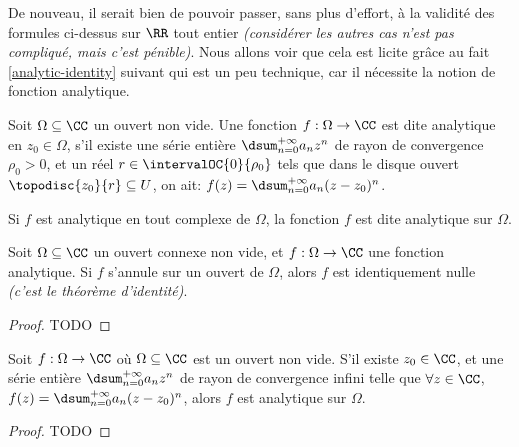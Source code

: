 De nouveau, il serait bien de pouvoir passer, sans plus d'effort, à la validité des formules ci-dessus sur $\RR$ tout entier \emph{(considérer les autres cas n'est pas compliqué, mais c'est pénible)}.
%
Nous allons voir que cela est licite grâce au fait \ref{analytic-identity} suivant qui est un peu technique, car il nécessite la notion de fonction analytique.


\begin{defi}
    Soit $\Omega \subseteq \CC$ un ouvert non vide.
	Une fonction $f: \Omega \rightarrow \CC$ est dite analytique en $z_0 \in \Omega$, 
	s'il existe
	une série entière $\dsum_{n = 0}^{+\infty} a_n z^n$
	de rayon de convergence $\rho_0 > 0$,
	et
	un réel $r \in \intervalOC{0}{\rho_0}$ tels que dans le disque ouvert $\topodisc{z_0}{r} \subseteq U$, on ait:
	$f(z) = \dsum_{n = 0}^{+\infty} a_n (z - z_0)^n$.

	\smallskip
	
	Si $f$ est analytique en tout complexe de $\Omega$,
	la fonction $f$ est dite analytique sur $\Omega$.
\end{defi}


\begin{fact} \label{analytic-identity}
    Soit $\Omega \subseteq \CC$ un ouvert connexe non vide,
    et
    $f: \Omega \rightarrow \CC$ une fonction analytique.
	Si $f$ s'annule sur un ouvert de $\Omega$, alors $f$ est identiquement nulle
	\emph{(c'est le théorème d'identité)}.  
\end{fact}


\begin{proof}
	TODO
\end{proof}


\begin{fact} \label{power-series-vs-analytic}
    Soit $f: \Omega \rightarrow \CC$ où $\Omega \subseteq \CC$ est un ouvert non vide.
    S'il existe
    $z_0 \in \CC$,
    et
    une série entière $\dsum_{n = 0}^{+\infty} a_n z^n$ de rayon de convergence infini
    telle que
	$\forall z \in \CC$, $f(z) = \dsum_{n = 0}^{+\infty} a_n (z - z_0)^n$,
	alors
	$f$ est analytique sur $\Omega$. 
\end{fact}


\begin{proof}
	TODO
\end{proof}


